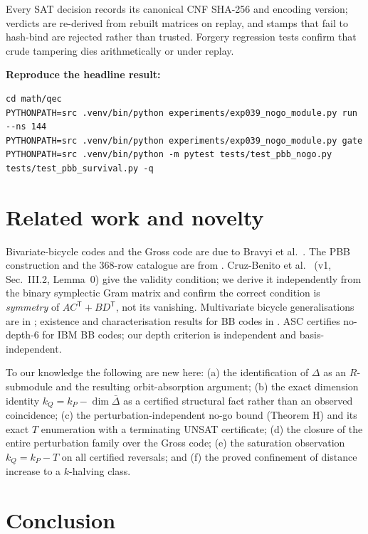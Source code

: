 \documentclass[11pt]{article}
\theoremstyle{plain}
\theoremstyle{remark}
\begin{document}
Every SAT decision records its canonical CNF SHA-256 and encoding version; verdicts are
re-derived from rebuilt matrices on replay, and stamps that fail to hash-bind are
rejected rather than trusted. Forgery regression tests confirm that crude tampering dies
arithmetically or under replay.

\medskip
\noindent\textbf{Reproduce the headline result:}

{\footnotesize
\begin{verbatim}
cd math/qec
PYTHONPATH=src .venv/bin/python experiments/exp039_nogo_module.py run --ns 144
PYTHONPATH=src .venv/bin/python experiments/exp039_nogo_module.py gate
PYTHONPATH=src .venv/bin/python -m pytest tests/test_pbb_nogo.py tests/test_pbb_survival.py -q
\end{verbatim}
}

\section{Related work and novelty}\label{sec:related}

Bivariate-bicycle codes and the Gross code are due to Bravyi et
al.~\cite{bravyi2024faulttolerant}. The PBB construction and the $368$-row catalogue are
from \cite{cruzbenito2026evolutionary}. Cruz-Benito et al.~\cite{cruzbenito2026evolutionary}
(v1, Sec.~III.2, Lemma~0) give the
validity condition; we derive it independently from the binary symplectic Gram matrix and
confirm the correct condition is \emph{symmetry} of $AC^{\mathsf T}+BD^{\mathsf T}$, not its
vanishing. Multivariate bicycle generalisations are in \cite{voss2024multivariate};
existence and characterisation results for BB codes in
\cite{postema2025existence}. ASC \cite{zhang2026asc} certifies
no-depth-$6$ for IBM BB codes; our depth criterion is independent and basis-independent.

To our knowledge the following are new here: (a) the identification of $\Delta$ as an
$R$-submodule and the resulting orbit-absorption argument; (b) the exact dimension
identity $k_Q=k_P-\dim\bar\Delta$ as a certified structural fact rather than an observed
coincidence; (c) the perturbation-independent no-go bound (Theorem H) and its exact
$T$ enumeration with a terminating UNSAT certificate; (d) the closure of the entire
perturbation family over the Gross code; (e) the saturation observation $k_Q=k_P-T$ on
all certified reversals; and (f) the proved confinement of distance increase to a
$k$-halving class.

\section{Conclusion}\label{sec:conclusion}
\end{document}
